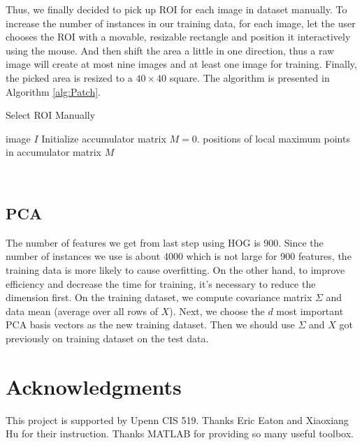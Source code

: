 \documentclass{article}
\begin{document}
Thus, we finally decided to pick up ROI for each image in dataset manually. To increase the number of instances in our training data, for each image, let the user chooses the ROI with a movable, resizable rectangle and position it interactively using the mouse. And then shift the area a little in one direction, thus a raw image will create at most nine images and at least one image for training. Finally, the picked area is resized to a $40 \times 40$ square. The algorithm is presented in Algorithm \ref{alg:Patch}.
\begin{algorithm}[tb]
   \caption{Select ROI Manually}
   \label{alg:Patch}
\begin{algorithmic}
    image $I$
   \STATE Initialize accumulator matrix $M = 0$.
   \ENDIF
   \ENDFOR
   \ENDFOR
    positions of local maximum points in accumulator matrix $M$
\end{algorithmic}
\end{algorithm}\\

\subsection{PCA}
The number of features we get from last step using HOG is 900. Since the number of instances we use is about 4000 which is not large for 900 features, the training data is more likely to cause overfitting. On the other hand, to improve efficiency and decrease the time for training, it's necessary to reduce the dimension first. On the training dataset, we compute covariance matrix $\Sigma$ and data mean (average over all rows of $X$). Next, we choose the $d$ most important PCA basis vectors as the new training dataset. Then we should use $\Sigma$ and $X$ got previously on training dataset on the test data.






\section*{Acknowledgments} 
This project is supported by Upenn CIS 519. Thanks Eric Eaton and Xiaoxiang Hu for their instruction. Thanks MATLAB for providing so many useful toolbox.



\end{document}
